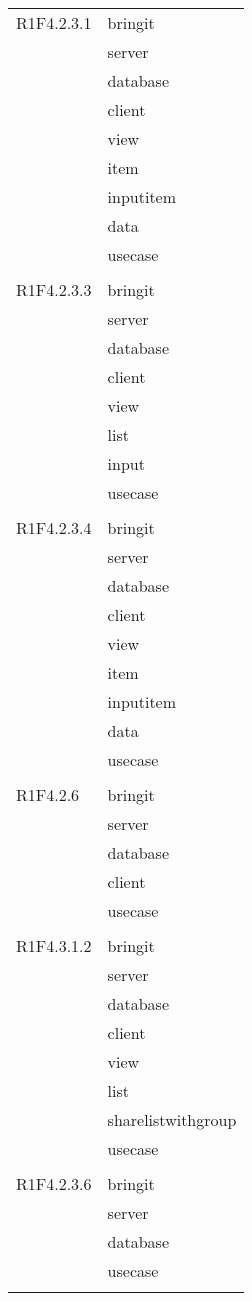 \begin{center}
\begin{longtable}{|p{7cm}|p{7cm}|}
		R1F4.2.3.1 & bringit \\ & server \\ & database \\ & client \\ & view \\ & item \\ & inputitem \\ & data \\ & usecase \\ & \\ \hline
		R1F4.2.3.3 & bringit \\ & server \\ & database \\ & client \\ & view \\ & list \\ & input \\ & usecase \\ & \\ \hline
		R1F4.2.3.4 & bringit \\ & server \\ & database \\ & client \\ & view \\ & item \\ & inputitem \\ & data \\ & usecase \\ & \\ \hline
		R1F4.2.6 & bringit \\ & server \\ & database \\ & client \\ & usecase \\ & \\ \hline
		R1F4.3.1.2 & bringit \\ & server \\ & database \\ & client \\ & view \\ & list \\ & sharelistwithgroup \\ & usecase \\ & \\ \hline
		R1F4.2.3.6 & bringit \\ & server \\ & database \\ & usecase \\ & \\ \hline

\end{longtable}
\end{center}
